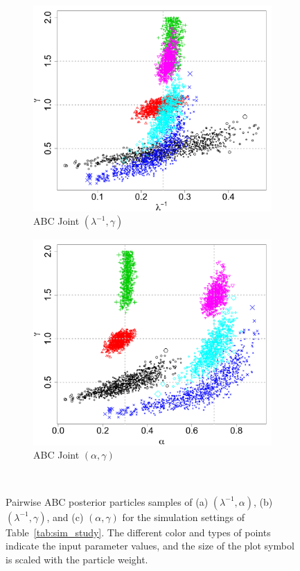 \documentclass[ejs]{imsart}
\numberwithin{equation}{section}
\theoremstyle{plain}
\begin{document}
\begin{figure}[htbp]
\begin{subfigure}{0.32\textwidth}
\includegraphics[width = \textwidth]{figures/joint_k_gamma.pdf} 
\caption{ABC Joint $(\lambda^{-1}, \gamma)$}\label{subfig:joint_gamma_k}
\end{subfigure}
\begin{subfigure}{0.32\textwidth}
\centering
\includegraphics[width = \textwidth]{figures/joint_alpha_gamma.pdf} 
\caption{ABC Joint $(\alpha, \gamma)$}\label{subfig:joint_gamma_alpha}
\end{subfigure} \\
\caption{Pairwise ABC posterior particles samples of (a) $(\lambda^{-1}, \alpha)$, (b) $(\lambda^{-1}, \gamma)$, and (c) $(\alpha, \gamma)$ for the simulation settings of Table~\ref{tab:sim_study}.  The different color and types of points indicate the input parameter values, and the size of the plot symbol is scaled with the particle weight.
}
\label{fig:abc_pa_joints}
\end{figure}
\end{document}
